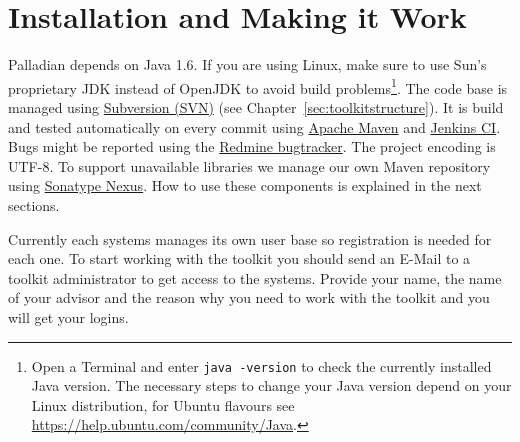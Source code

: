 \chapter{Installation and Making it Work}
Palladian depends on Java 1.6. If you are using Linux, make sure to use Sun's proprietary JDK instead of OpenJDK to avoid build problems\footnote{Open a Terminal and enter \texttt{java -version} to check the currently installed Java version. The necessary steps to change your Java version depend on your Linux distribution, for Ubuntu flavours see \url{https://help.ubuntu.com/community/Java}.}. The code base is managed using \href{http://subversion.apache.org/}{Subversion (SVN)} (see Chapter~\ref{sec:toolkitstructure}). It is build and tested automatically on every commit using \href{http://maven.apache.org/}{Apache Maven} and \href{http://jenkins-ci.org/}{Jenkins CI}. Bugs might be reported using the \href{http://www.redmine.org/}{Redmine bugtracker}. The project encoding is UTF-8. To support unavailable libraries we manage our own Maven repository using \href{http://nexus.sonatype.org/}{Sonatype Nexus}. How to use these components is explained in the next sections.

Currently each systems manages its own user base so registration is needed for each one. To start working with the toolkit you should send an E-Mail to a toolkit administrator to get access to the systems. Provide your name, the name of your advisor and the reason why you need to work with the toolkit and you will get your logins.
